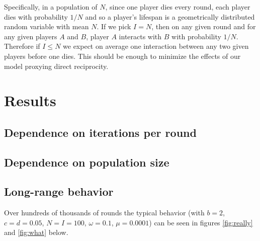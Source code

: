 \documentclass{amsart}
\begin{document}
Specifically, in a population of $N$, since one player dies every
round, each player dies with probability $1/N$ and so a player's
lifespan is a geometrically distributed random variable with mean
$N$. If we pick $I=N$, then on any given round and for any given
players $A$ and $B$, player $A$ interacts with $B$ with probability
$1/N$. Therefore if $I\le N$ we expect on average one interaction
between any two given players before one dies. This should be enough
to minimize the effects of our model proxying direct reciprocity.

\section{Results}
\label{sec:results}

\subsection{Dependence on iterations per round}

\subsection{Dependence on population size}

\subsection{Long-range behavior}
\label{sec:longrange}
Over hundreds of thousands of rounds the typical behavior (with $b=2$,
$c = d = 0.05$, $N = I = 100$, $\omega = 0.1$, $\mu = 0.0001$) can be
seen in figures \ref{fig:really} and \ref{fig:what} below.
\end{document}
